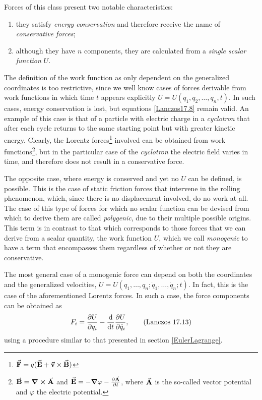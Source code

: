 \documentclass[12pt, spanish, a4paper, ]{article}
\begin{document}
Forces of this class present two notable characteristics:
\begin{enumerate}
	\item they satisfy \emph{energy conservation} and therefore receive the name of \emph{conservative forces};
	\item although they have \(n\) components, they are calculated from a \emph{single scalar function} \(U\).
\end{enumerate}

The definition of the work function as only dependent on the generalized coordinates is too restrictive, since we well know cases of forces derivable from work functions in which time \(t\) appears explicitly \(U= U(q_1, q_2, \ldots, q_n,t)\).
In such cases, energy conservation is lost, but equations \eqref{Lanczos17.8} remain valid.
An example of this case is that of a particle with electric charge in a \emph{cyclotron} that after each cycle returns to the same starting point but with greater kinetic energy.
Clearly, the Lorentz forces\footnote{\(\va{F}= q (\va{E}+ \va{v}\times \va{B})\)} involved can be obtained from work functions\footnote{\(\va{B}= \curl{\va{A}}\) and \(\va{E}= -\grad \varphi - \pdv{\va{A}}{t}\), where \(\va{A}\) is the so-called vector potential and \(\varphi\) the electric potential.}, but in the particular case of the \emph{cyclotron} the electric field varies in time, and therefore does not result in a conservative force.

The opposite case, where energy is conserved and yet no \(U\) can be defined, is possible.
This is the case of static friction forces that intervene in the rolling phenomenon, which, since there is no displacement involved, do no work at all.
The case of this type of forces for which no scalar function can be devised from which to derive them are called \emph{polygenic}, due to their multiple possible origins.
This term is in contrast to that which corresponds to those forces that we can derive from a scalar quantity, the work function \(U\), which we call \emph{monogenic} to have a term that encompasses them regardless of whether or not they are conservative.

The most general case of a monogenic force can depend on both the coordinates and the generalized velocities, \(U= U(q_1, \ldots, q_n; \dot{q}_1, \ldots, \dot{q}_n; t)\).
In fact, this is the case of the aforementioned Lorentz forces.
In such a case, the force components can be obtained as
\begin{equation}\label{Lanczos17.13}
	F_i= \pdv{U}{q_i}- \dv{t} \pdv{U}{\dot{q}_i},
	\tag{Lanczos 17.13}
\end{equation}
using a procedure similar to that presented in section \ref{EulerLagrange}.
\end{document}
